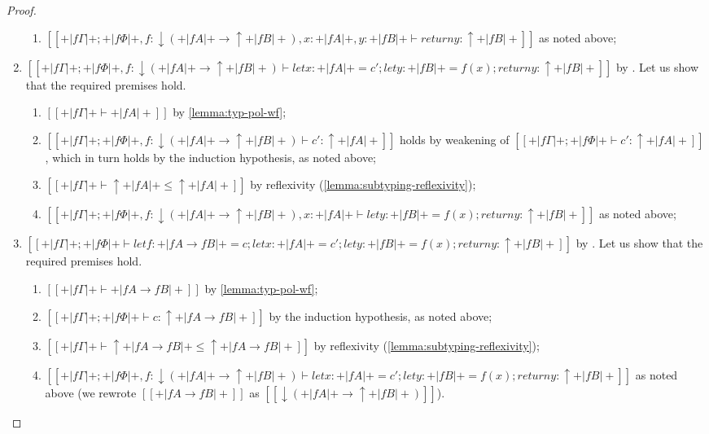 \begin{proof}
\begin{caseof}
\begin{enumerate}
\begin{enumerate}
            \item $[[+|fΓ|+ ; +|fΦ|+, f:↓(+|fA|+ → ↑+|fB|+), x:+|fA|+, y:+|fB|+ ⊢ return y : ↑+|fB|+]]$ 
            as noted above;
          \end{enumerate}
        \item $[[+|fΓ|+ ; +|fΦ|+, f:↓(+|fA|+ → ↑+|fB|+) ⊢ let x:+|fA|+ = c'; let y:+|fB|+ = f(x); return y : ↑+|fB|+]]$ by 
          . Let us show that the 
          required premises hold. 
          \begin{enumerate}
            \item $[[+|fΓ|+ ⊢ +|fA|+]]$ by \cref{lemma:typ-pol-wf};
            \item $[[+|fΓ|+ ; +|fΦ|+, f:↓(+|fA|+ → ↑+|fB|+) ⊢ c' : ↑+|fA|+]]$
              holds by weakening of $[[+|fΓ|+ ; +|fΦ|+ ⊢ c' : ↑+|fA|+]]$, which in turn holds by the induction hypothesis,
              as noted above;
            \item $[[+|fΓ|+  ⊢ ↑+|fA|+ ≤ ↑+|fA|+]]$ by reflexivity (\cref{lemma:subtyping-reflexivity});
            \item $[[+|fΓ|+ ; +|fΦ|+, f:↓(+|fA|+ → ↑+|fB|+), x:+|fA|+ ⊢ let y:+|fB|+ = f(x); return y : ↑+|fB|+]]$ as noted above;
          \end{enumerate}
        \item $[[+|fΓ|+ ; +|fΦ|+ ⊢ let f : +|fA → fB|+ = c; let x : +|fA|+ = c'; let y:+|fB|+ = f(x); return y : ↑+|fB|+]]$ by 
          . Let us show that the 
          required premises hold. 
          \begin{enumerate}
            \item $[[+|fΓ|+ ⊢ +|fA → fB|+]]$ by \cref{lemma:typ-pol-wf};
            \item $[[+|fΓ|+ ; +|fΦ|+ ⊢ c : ↑+|fA → fB|+]]$ by the induction hypothesis, as noted above;
            \item $[[+|fΓ|+  ⊢ ↑+|fA → fB|+ ≤ ↑+|fA → fB|+]]$ by reflexivity (\cref{lemma:subtyping-reflexivity});
            \item $[[+|fΓ|+ ; +|fΦ|+, f:↓(+|fA|+ → ↑+|fB|+) ⊢ let x:+|fA|+ = c'; let y:+|fB|+ = f(x); return y : ↑+|fB|+]]$ 
              as noted above (we rewrote $[[+|fA → fB|+]]$ as $[[↓(+|fA|+ → ↑+|fB|+)]]$).
          \end{enumerate}
      \end{enumerate}


\end{caseof}
\end{proof}
